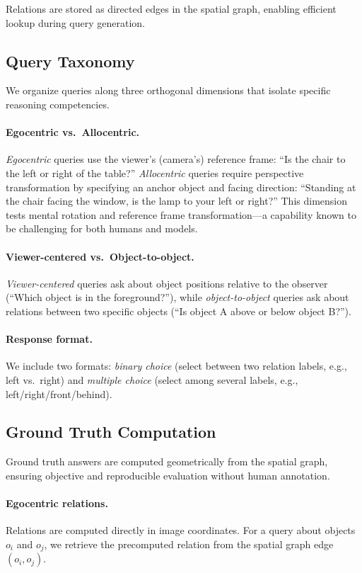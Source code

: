 Relations are stored as directed edges in the spatial graph, enabling efficient lookup during query generation.

\subsection{Query Taxonomy}

We organize queries along three orthogonal dimensions that isolate specific reasoning competencies.

\paragraph{Egocentric vs.\ Allocentric.} \textit{Egocentric} queries use the viewer's (camera's) reference frame: ``Is the chair to the left or right of the table?'' \textit{Allocentric} queries require perspective transformation by specifying an anchor object and facing direction: ``Standing at the chair facing the window, is the lamp to your left or right?'' This dimension tests mental rotation and reference frame transformation---a capability known to be challenging for both humans and models.

\paragraph{Viewer-centered vs.\ Object-to-object.} \textit{Viewer-centered} queries ask about object positions relative to the observer (``Which object is in the foreground?''), while \textit{object-to-object} queries ask about relations between two specific objects (``Is object A above or below object B?'').

\paragraph{Response format.} We include two formats: \textit{binary choice} (select between two relation labels, e.g., left vs.\ right) and \textit{multiple choice} (select among several labels, e.g., left/right/front/behind).

\subsection{Ground Truth Computation}

Ground truth answers are computed geometrically from the spatial graph, ensuring objective and reproducible evaluation without human annotation.

\paragraph{Egocentric relations.} Relations are computed directly in image coordinates. For a query about objects $o_i$ and $o_j$, we retrieve the precomputed relation from the spatial graph edge $(o_i, o_j)$.

